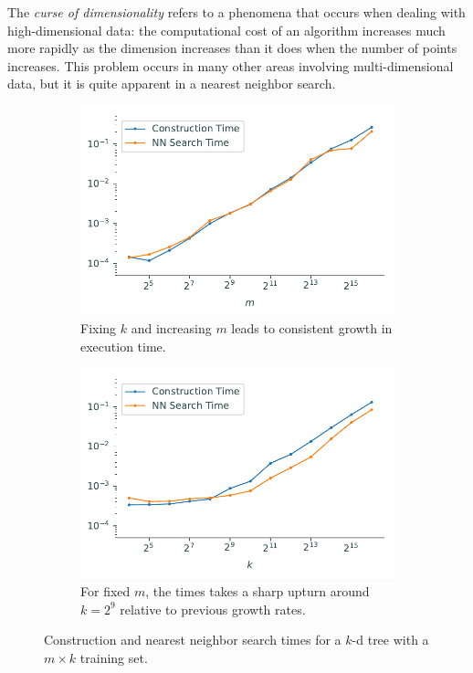 The \emph{curse of dimensionality} refers to a phenomena that occurs when dealing with high-dimensional data: the computational cost of an algorithm increases much more rapidly as the dimension increases than it does when the number of points increases.
This problem occurs in many other areas involving multi-dimensional data, but it is quite apparent in a nearest neighbor search.

\begin{figure}[H] %
\captionsetup[subfigure]{justification=centering}
\centering
\begin{subfigure}{.49\textwidth}
    \centering
    \includegraphics[width=\textwidth]{figures/curse_m.pdf}
    \caption{Fixing $k$ and increasing $m$ leads to consistent growth in execution time.}
\end{subfigure}
%
\begin{subfigure}{.49\textwidth}
    \centering
    \includegraphics[width=\textwidth]{figures/curse_k.pdf}
    \caption{For fixed $m$, the times takes a sharp upturn around $k = 2^9$ relative to previous growth rates.}
\end{subfigure}
\caption{Construction and nearest neighbor search times for a $k$-d tree with a $m\times k$ training set.}
\end{figure}

